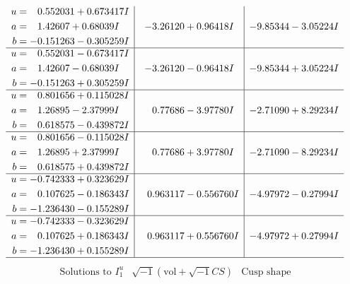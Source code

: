 \documentclass[1p]{elsarticle_modified}
\theoremstyle{definition}
\newcommand{\I}{\sqrt{-1}}
\begin{document}
$$\begin{array}{c|c|c}
\begin{aligned}
u &= \phantom{-}0.552031 + 0.673417 I \\
a &= \phantom{-}1.42607 + 0.68039 I \\
b &= -0.151263 - 0.305259 I\end{aligned}
 & -3.26120 + 0.96418 I & -9.85344 - 3.05224 I \\ \hline\begin{aligned}
u &= \phantom{-}0.552031 - 0.673417 I \\
a &= \phantom{-}1.42607 - 0.68039 I \\
b &= -0.151263 + 0.305259 I\end{aligned}
 & -3.26120 - 0.96418 I & -9.85344 + 3.05224 I \\ \hline\begin{aligned}
u &= \phantom{-}0.801656 + 0.115028 I \\
a &= \phantom{-}1.26895 - 2.37999 I \\
b &= \phantom{-}0.618575 - 0.439872 I\end{aligned}
 & \phantom{-}0.77686 - 3.97780 I & -2.71090 + 8.29234 I \\ \hline\begin{aligned}
u &= \phantom{-}0.801656 - 0.115028 I \\
a &= \phantom{-}1.26895 + 2.37999 I \\
b &= \phantom{-}0.618575 + 0.439872 I\end{aligned}
 & \phantom{-}0.77686 + 3.97780 I & -2.71090 - 8.29234 I \\ \hline\begin{aligned}
u &= -0.742333 + 0.323629 I \\
a &= \phantom{-}0.107625 - 0.186343 I \\
b &= -1.236430 - 0.155289 I\end{aligned}
 & \phantom{-}0.963117 - 0.556760 I & -4.97972 - 0.27994 I \\ \hline\begin{aligned}
u &= -0.742333 - 0.323629 I \\
a &= \phantom{-}0.107625 + 0.186343 I \\
b &= -1.236430 + 0.155289 I\end{aligned}
 & \phantom{-}0.963117 + 0.556760 I & -4.97972 + 0.27994 I\\
 \hline 
 \end{array}$$\newpage$$\begin{array}{c|c|c}  
\text{Solutions to }I^u_{1}& \I (\text{vol} + \sqrt{-1}CS) & \text{Cusp shape}\\

\end{array}$$
\end{document}
